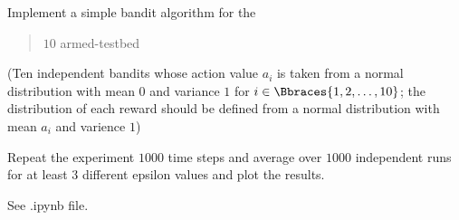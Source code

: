 \begin{exercise}
Implement a simple bandit algorithm for the \blockquote{$10$ armed-testbed}.
(Ten independent bandits whose action value $a_i$ is taken from a normal distribution with mean $0$ and variance $1$ for $i \in \Bbraces{1, 2, \dots, 10}$; the distribution of each reward should be defined from a normal distribution with mean $a_i$ and varience $1$)

Repeat the experiment $1000$ time steps and average over $1000$ independent runs for at least $3$ different epsilon values and plot the results.

\end{exercise}

\begin{solution}
See .ipynb file.
\end{solution}

